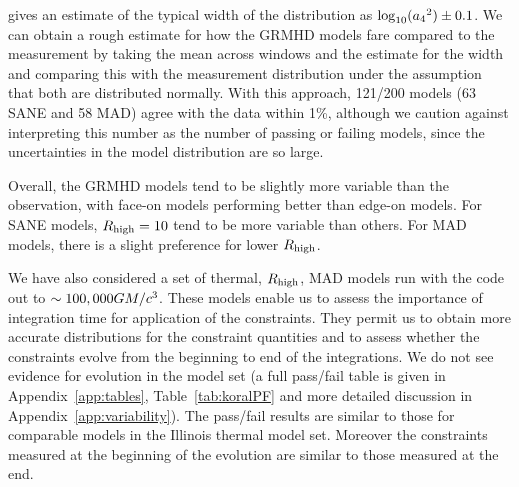 \citet{Georgiev_2022} gives an estimate of the typical width of the distribution as $\log_{10}({a_4}^2) \pm 0.1$. We can obtain a rough estimate for how the GRMHD models fare compared to the measurement by taking the mean across windows and the estimate for the width and comparing this with the measurement distribution under the assumption that both are distributed normally. With this approach, 121/200 models (63 SANE and 58 MAD) agree with the data within 1\%, although we caution against interpreting this number as the number of passing or failing models, since the uncertainties in the model distribution are so large.

Overall, the GRMHD models tend to be slightly more variable than the observation, with face-on models performing better than edge-on models. For SANE models, $R_\mathrm{high} = 10$ tend to be more variable than others. For MAD models, there is a slight preference for lower $R_\mathrm{high}$.

We have also considered a set of thermal, $R_\mathrm{high}$, MAD models run with the \koral code out to $\sim 100,000GM/c^3$.  These models enable us to assess the importance of integration time for application of the constraints.  They permit us to obtain more accurate distributions for the constraint quantities and to assess whether the constraints evolve from the beginning to end of the integrations. We do not see evidence for evolution in the \koral model set (a full pass/fail table is given in Appendix~\ref{app:tables}, Table~\ref{tab:koralPF} and more detailed discussion in Appendix~\ref{app:variability}). The \koral pass/fail results are similar to those for comparable models in the Illinois thermal model set. Moreover the constraints measured at the beginning of the evolution are similar to those measured at the end.



